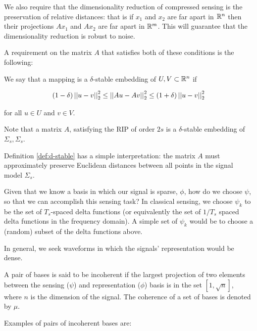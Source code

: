\documentclass[12pt]{report}
\begin{document}
\begin{remark} [Stability]
We also require that the dimensionality reduction of compressed sensing is the preservation of relative distances: that is if \(x_1\) and \(x_2\) are far apart in \({\mathbb{R}}^n\) then their projections \(Ax_1\) and \(Ax_2\) are far apart in \({\mathbb{R}}^m\). This will guarantee that the dimensionality reduction is robust to noise. 
\end{remark}

A requirement on the matrix \(A\) that satisfies both of these conditions is the following:

\begin{definition}
We say that a mapping is a \(\delta\)-stable embedding of \(U,V \subset {\mathbb{R}}^n\) if

\begin{equation}
\left(1 - \delta \right) \left|\left|u-v\right|\right|_2^2 \leq \left|\left|Au-Av\right|\right|_2^2 \leq \left(1 + \delta\right) \left|\left|u-v\right|\right|_2^2
\end{equation}

for all \(u \in U\) and \(v \in V\). 
\label{def:d-stable}
\end{definition} 

\begin{remark}
Note that a matrix \(A\), satisfying the RIP of order \(2s\) is a \(\delta\)-stable embedding of \(\Sigma_s, \Sigma_s\). 
\end{remark}

\begin{remark}
Definition \ref{def:d-stable} has a simple interpretation: the matrix \(A\) must approximately preserve Euclidean distances between all points in the signal model \(\Sigma_s\).
\end{remark}

Given that we know a basis in which our signal is sparse, \(\phi\), how do we choose \(\psi\), so that we can accomplish this sensing task? In classical sensing, we choose \(\psi_k\) to be the set of \( T_s \)-spaced delta functions (or equivalently the set of \( 1/T_s \) spaced delta functions in the frequency domain). A simple set of \(\psi_k\) would be to choose a (random) subset of the delta functions above.

In general, we seek waveforms in which the signals' representation would be dense.

\begin{definition}[Incoherence]
A pair of bases is said to be incoherent if the largest projection of two elements between the sensing (\(\psi\)) and representation (\(\phi\)) basis  is in the set \( [1 , \sqrt{n}] \), where \( n \) is the dimension of the signal. The coherence of a set of bases is denoted by \(\mu\).
\end{definition}
Examples of pairs of incoherent bases are:
\end{document}
